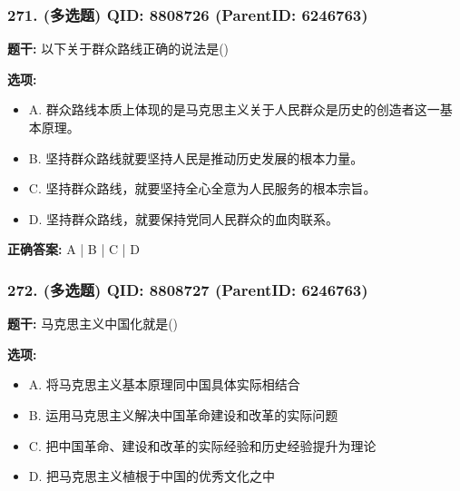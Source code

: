\documentclass[12pt,UTF8]{ctexart}
\begin{document}
\subsubsection*{271. (多选题) \small QID: 8808726 (ParentID: 6246763)}

\textbf{题干:}
以下关于群众路线正确的说法是()



\textbf{选项:}
\begin{itemize}[leftmargin=*]

  \item A. 群众路线本质上体现的是马克思主义关于人民群众是历史的创造者这一基本原理。

  \item B. 坚持群众路线就要坚持人民是推动历史发展的根本力量。

  \item C. 坚持群众路线，就要坚持全心全意为人民服务的根本宗旨。

  \item D. 坚持群众路线，就要保持党同人民群众的血肉联系。

\end{itemize}

\textbf{正确答案:}
A | B | C | D

\vspace{0.3em}\hrulefill\vspace{0.7em}

\subsubsection*{272. (多选题) \small QID: 8808727 (ParentID: 6246763)}

\textbf{题干:}
马克思主义中国化就是()



\textbf{选项:}
\begin{itemize}[leftmargin=*]

  \item A. 将马克思主义基本原理同中国具体实际相结合

  \item B. 运用马克思主义解决中国革命建设和改革的实际问题

  \item C. 把中国革命、建设和改革的实际经验和历史经验提升为理论

  \item D. 把马克思主义植根于中国的优秀文化之中

\end{itemize}
\end{document}
